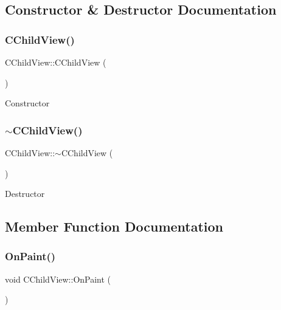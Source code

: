 \subsection{Constructor \& Destructor Documentation}
\mbox{\label{class_c_child_view_aff5af7c162c10755edbe58f260ded6d4}} 
\subsubsection{\texorpdfstring{C\+Child\+View()}{CChildView()}}
{\footnotesize\ttfamily C\+Child\+View\+::\+C\+Child\+View (\begin{DoxyParamCaption}{ }\end{DoxyParamCaption})}

Constructor \mbox{\label{class_c_child_view_a5b033b5e0a130950719a173b86418698}} 
\subsubsection{\texorpdfstring{$\sim$\+C\+Child\+View()}{~CChildView()}}
{\footnotesize\ttfamily C\+Child\+View\+::$\sim$\+C\+Child\+View (\begin{DoxyParamCaption}{ }\end{DoxyParamCaption})\hspace{0.3cm}{\ttfamily [virtual]}}

Destructor 

\subsection{Member Function Documentation}
\mbox{\label{class_c_child_view_a8ea6d42631a4f9f446923ff864b239ab}} 
\subsubsection{\texorpdfstring{On\+Paint()}{OnPaint()}}
{\footnotesize\ttfamily void C\+Child\+View\+::\+On\+Paint (\begin{DoxyParamCaption}{ }\end{DoxyParamCaption})\hspace{0.3cm}{\ttfamily [protected]}}

